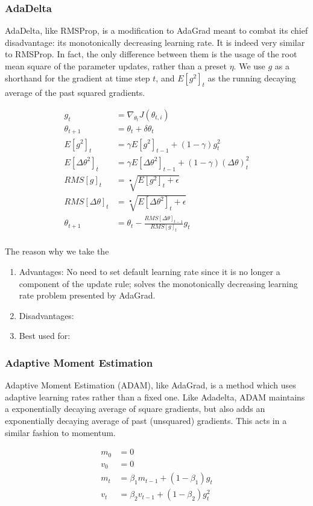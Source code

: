 \documentclass[twoside,11pt]{homework}
\begin{document}
\subsubsection{AdaDelta}
AdaDelta, like RMSProp, is a modification to AdaGrad meant to combat its chief disadvantage: its monotonically decreasing learning  rate. It is indeed very similar to RMSProp. In fact, the only difference between them is the usage of the root mean square of the parameter updates, rather than a preset $\eta$. We use $g$ as a shorthand for the gradient at time step $t$, and $E[g^2]_t$ as the running decaying average of the past squared gradients. 

\begin{align*}
	g_t &= \nabla_{\theta_t} J(\theta_{t, i})\\
	\theta_{t+1} &= \theta_t + \delta \theta_t\\
	E[g^2]_t &= \gamma E[g^2]_{t-1} + (1-\gamma)g^2_t \\
	E[\Delta \theta^2]_t &= \gamma E[\Delta \theta^2]_{t-1} + (1-\gamma)(\Delta \theta)^2_t \\
	RMS[g]_t &= \sqrt[•]{E[g^2]_t+\epsilon}\\
	RMS[\Delta \theta]_t &= \sqrt[•]{E[\Delta \theta^2]_t+\epsilon}\\
	\theta_{t+1} &= \theta_t - \frac{RMS[\Delta \theta]_{t-1}}{RMS[g]_t} g_t\\
\end{align*}

The reason why we take the 
\begin{enumerate}
	\item Advantages: No need to set default learning rate since it is no longer a component of the update rule; solves the monotonically decreasing learning rate problem presented by AdaGrad.
	\item Disadvantages:
	\item Best used for:
\end{enumerate}
\subsubsection{Adaptive Moment Estimation}
Adaptive Moment Estimation (ADAM), like AdaGrad, is a method which uses adaptive learning rates rather than a fixed one. Like Adadelta, ADAM maintains a exponentially decaying average of square gradients, but also adds an exponentially decaying average of past (unsquared) gradients. This acts in a similar fashion to momentum.

\begin{align*}
	m_0 &= 0\\
	v_0 &= 0\\
	m_t &= \beta_1 m_{t-1}+(1-\beta_1)g_t\\
	v_t &= \beta_2 v_{t-1}+(1-\beta_2)g^2_t\\
\end{align*} 
\end{document}
